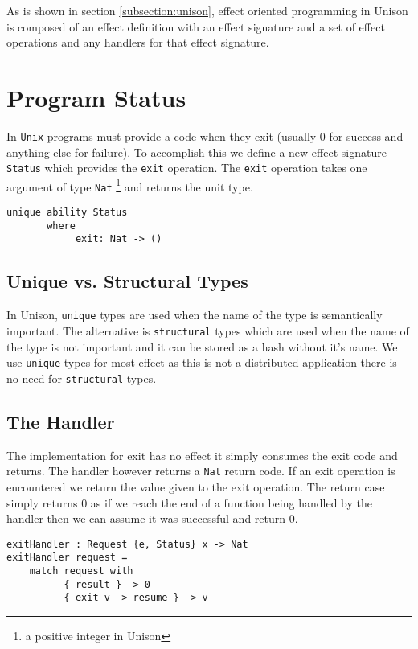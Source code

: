 \documentclass[logo,bsc,singlespacing,parskip]{infthesis}
\begin{document}
As is shown in section \ref{subsection:unison}, effect oriented programming in
Unison is composed of an effect definition with an effect signature and a set
of effect operations and any handlers for that effect signature.

\section{Program Status}
\label{status}

In \texttt{Unix} programs must provide a code when they exit (usually 0 for
success and anything else for failure). To accomplish this we define a new effect
signature \texttt{Status} which provides the \texttt{exit} operation. The
\texttt{exit} operation takes one argument of type \texttt{Nat} \footnote{a
positive integer in Unison} and returns the unit type.

\begin{lstlisting}[language=unison]
unique ability Status
       where
            exit: Nat -> ()
\end{lstlisting}

\subsection{Unique vs. Structural Types}

In Unison, \texttt{unique} types are used when the name of the type is
semantically important. The alternative is \texttt{structural} types which are
used when the name of the type is not important and it can be stored as a hash
without it's name. We use \texttt{unique} types for most effect as this is not
a distributed application there is no need for \texttt{structural} types.

\subsection{The Handler}

The implementation for exit has no effect it simply consumes the exit code and
returns. The handler however returns a \texttt{Nat} return code. If an exit
operation is encountered we return the value given to the exit operation. The
return case simply returns 0 as if we reach the end of a function being handled
by the handler then we can assume it was successful and return 0.

\begin{lstlisting}[language=unison]
exitHandler : Request {e, Status} x -> Nat
exitHandler request =
    match request with
          { result } -> 0
          { exit v -> resume } -> v
\end{lstlisting}
\end{document}
